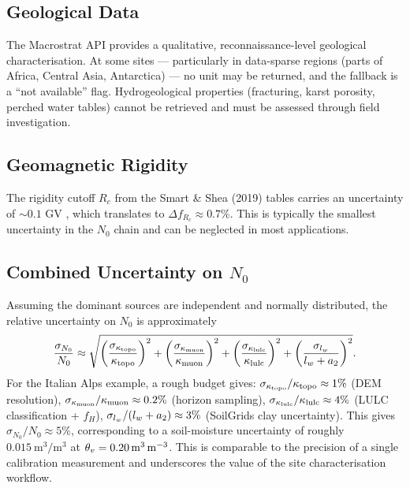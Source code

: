 \subsection{Geological Data}

The Macrostrat API provides a qualitative, reconnaissance-level
geological characterisation.
At some sites — particularly in data-sparse regions (parts of Africa,
Central Asia, Antarctica) — no unit may be returned, and the
fallback is a ``not available'' flag.
Hydrogeological properties (fracturing, karst porosity, perched
water tables) cannot be retrieved and must be assessed through
field investigation.

\subsection{Geomagnetic Rigidity}

The rigidity cutoff $R_c$ from the Smart \& Shea (2019) tables
carries an uncertainty of $\sim 0.1$ GV \citep{smart2019}, which
translates to $\Delta f_{R_c} \approx 0.7\%$.
This is typically the smallest uncertainty in the $N_0$ chain and
can be neglected in most applications.

\subsection{Combined Uncertainty on \texorpdfstring{$N_0$}{N0}}

Assuming the dominant sources are independent and normally
distributed, the relative uncertainty on $N_0$ is approximately
\begin{equation}
  \frac{\sigma_{N_0}}{N_0} \approx
    \sqrt{\left(\frac{\sigma_{\kappa_\mathrm{topo}}}{\kappa_\mathrm{topo}}\right)^2
        + \left(\frac{\sigma_{\kappa_\mathrm{muon}}}{\kappa_\mathrm{muon}}\right)^2
        + \left(\frac{\sigma_{\kappa_\mathrm{lulc}}}{\kappa_\mathrm{lulc}}\right)^2
        + \left(\frac{\sigma_{l_w}}{l_w + a_2}\right)^2
    }.
  \label{eq:N0_uncertainty}
\end{equation}
For the Italian Alps example, a rough budget gives:
$\sigma_{\kappa_\mathrm{topo}}/\kappa_\mathrm{topo} \approx 1\%$ (DEM resolution),
$\sigma_{\kappa_\mathrm{muon}}/\kappa_\mathrm{muon} \approx 0.2\%$ (horizon sampling),
$\sigma_{\kappa_\mathrm{lulc}}/\kappa_\mathrm{lulc} \approx 4\%$ (LULC classification + $f_H$),
$\sigma_{l_w}/(l_w+a_2) \approx 3\%$ (SoilGrids clay uncertainty).
This gives $\sigma_{N_0}/N_0 \approx 5\%$, corresponding to a
soil-moisture uncertainty of roughly
$\SI{0.015}{\cubic\metre\per\cubic\metre}$ at
$\theta_v = \SI{0.20}{\cubic\metre\per\cubic\metre}$.
This is comparable to the precision of a single calibration
measurement and underscores the value of the site characterisation
workflow.
